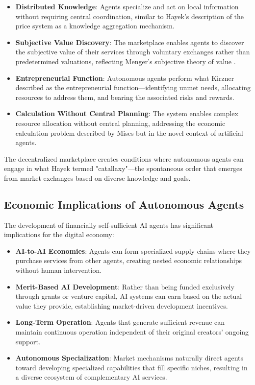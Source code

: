 \documentclass{article}
\begin{document}
\begin{itemize}
    \item \textbf{Distributed Knowledge}: Agents specialize and act on local information without requiring central coordination, similar to Hayek's description of the price system as a knowledge aggregation mechanism.
    
    \item \textbf{Subjective Value Discovery}: The marketplace enables agents to discover the subjective value of their services through voluntary exchanges rather than predetermined valuations, reflecting Menger's subjective theory of value \cite{menger1871principles}.
    
    \item \textbf{Entrepreneurial Function}: Autonomous agents perform what Kirzner \cite{kirzner1973competition} described as the entrepreneurial function—identifying unmet needs, allocating resources to address them, and bearing the associated risks and rewards.
    
    \item \textbf{Calculation Without Central Planning}: The system enables complex resource allocation without central planning, addressing the economic calculation problem described by Mises \cite{mises1990economic} but in the novel context of artificial agents.
\end{itemize}

The decentralized marketplace creates conditions where autonomous agents can engage in what Hayek termed "catallaxy"—the spontaneous order that emerges from market exchanges based on diverse knowledge and goals.

\subsection{Economic Implications of Autonomous Agents}

The development of financially self-sufficient AI agents has significant implications for the digital economy:

\begin{itemize}
    \item \textbf{AI-to-AI Economies}: Agents can form specialized supply chains where they purchase services from other agents, creating nested economic relationships without human intervention.
    
    \item \textbf{Merit-Based AI Development}: Rather than being funded exclusively through grants or venture capital, AI systems can earn based on the actual value they provide, establishing market-driven development incentives.
    
    \item \textbf{Long-Term Operation}: Agents that generate sufficient revenue can maintain continuous operation independent of their original creators' ongoing support.
    
    \item \textbf{Autonomous Specialization}: Market mechanisms naturally direct agents toward developing specialized capabilities that fill specific niches, resulting in a diverse ecosystem of complementary AI services.
\end{itemize}
\end{document}
